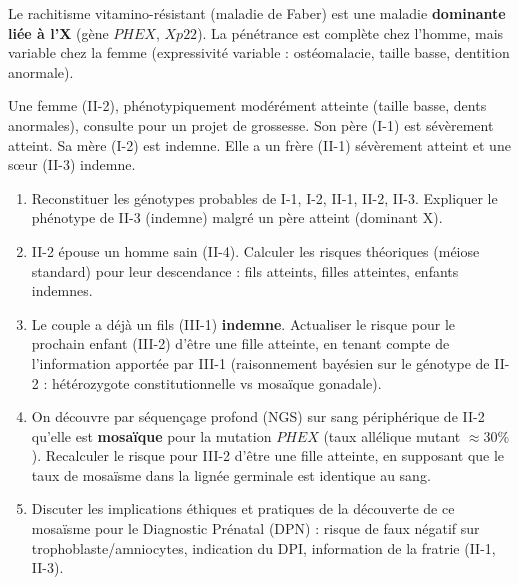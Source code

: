 \documentclass[11pt]{article}
\begin{document}
\begin{exercice}
Le rachitisme vitamino-résistant (maladie de Faber) est une maladie \textbf{dominante liée à l'X} (gène $PHEX$, $Xp22$). La pénétrance est complète chez l'homme, mais variable chez la femme (expressivité variable : ostéomalacie, taille basse, dentition anormale).

Une femme (II-2), phénotypiquement modérément atteinte (taille basse, dents anormales), consulte pour un projet de grossesse. Son père (I-1) est sévèrement atteint. Sa mère (I-2) est indemne. Elle a un frère (II-1) sévèrement atteint et une sœur (II-3) indemne.
\begin{enumerate}
    \item Reconstituer les génotypes probables de I-1, I-2, II-1, II-2, II-3. Expliquer le phénotype de II-3 (indemne) malgré un père atteint (dominant X).
    \item II-2 épouse un homme sain (II-4). Calculer les risques théoriques (méiose standard) pour leur descendance : fils atteints, filles atteintes, enfants indemnes.
    \item Le couple a déjà un fils (III-1) \textbf{indemne}. Actualiser le risque pour le prochain enfant (III-2) d'être une fille atteinte, en tenant compte de l'information apportée par III-1 (raisonnement bayésien sur le génotype de II-2 : hétérozygote constitutionnelle vs mosaïque gonadale).
    \item On découvre par séquençage profond (NGS) sur sang périphérique de II-2 qu'elle est \textbf{mosaïque} pour la mutation $PHEX$ (taux allélique mutant $\approx 30\%$). Recalculer le risque pour III-2 d'être une fille atteinte, en supposant que le taux de mosaïsme dans la lignée germinale est identique au sang.
    \item Discuter les implications éthiques et pratiques de la découverte de ce mosaïsme pour le Diagnostic Prénatal (DPN) : risque de faux négatif sur trophoblaste/amniocytes, indication du DPI, information de la fratrie (II-1, II-3).
\end{enumerate}
\end{exercice}
\end{document}
